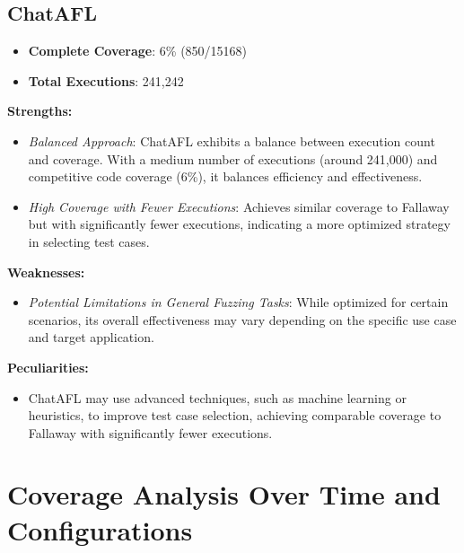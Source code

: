 \subsection{ChatAFL}

\begin{itemize}
    \item \textbf{Complete Coverage}: 6\% (850/15168)
    \item \textbf{Total Executions}: 241,242
\end{itemize}

\textbf{Strengths:}
\begin{itemize}
    \item \textit{Balanced Approach}: ChatAFL exhibits a balance between execution count and coverage. With a medium number of executions (around 241,000) and competitive code coverage (6\%), it balances efficiency and effectiveness.
    \item \textit{High Coverage with Fewer Executions}: Achieves similar coverage to Fallaway but with significantly fewer executions, indicating a more optimized strategy in selecting test cases.
\end{itemize}

\textbf{Weaknesses:}
\begin{itemize}
    \item \textit{Potential Limitations in General Fuzzing Tasks}: While optimized for certain scenarios, its overall effectiveness may vary depending on the specific use case and target application.
\end{itemize}

\textbf{Peculiarities:}
\begin{itemize}
    \item ChatAFL may use advanced techniques, such as machine learning or heuristics, to improve test case selection, achieving comparable coverage to Fallaway with significantly fewer executions.
\end{itemize}

\section{Coverage Analysis Over Time and Configurations}

